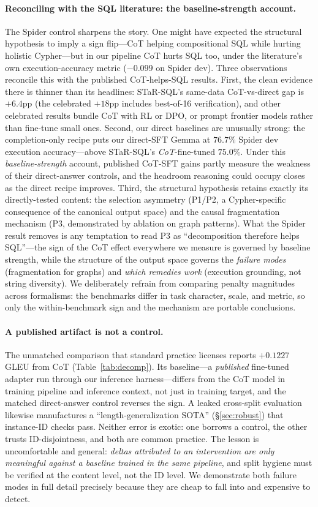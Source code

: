 \documentclass[11pt]{article}
\begin{document}
\paragraph{Reconciling with the SQL literature: the baseline-strength account.} The Spider control
sharpens the story. One might have expected the structural hypothesis to imply a sign flip---CoT
helping compositional SQL while hurting holistic Cypher---but in our pipeline CoT hurts SQL too,
under the literature's own execution-accuracy metric ($-0.099$ on Spider dev). Three observations
reconcile this with the published CoT-helps-SQL results. First, the clean evidence there is thinner
than its headlines: STaR-SQL's same-data CoT-vs-direct gap is $+6.4$pp (the celebrated $+18$pp
includes best-of-16 verification), and other celebrated results bundle CoT with RL or DPO, or prompt
frontier models rather than fine-tune small ones. Second, our direct baselines are unusually strong:
the completion-only recipe puts our direct-SFT Gemma at $76.7\%$ Spider dev execution
accuracy---above STaR-SQL's \emph{CoT}-fine-tuned $75.0\%$. Under this \emph{baseline-strength}
account, published CoT-SFT gains partly measure the weakness of their direct-answer controls, and
the headroom reasoning could occupy closes as the direct recipe improves. Third, the structural
hypothesis retains exactly its directly-tested content: the selection asymmetry (P1/P2, a
Cypher-specific consequence of the canonical output space) and the causal fragmentation mechanism
(P3, demonstrated by ablation on graph patterns). What the Spider result removes is any temptation
to read P3 as ``decomposition therefore helps SQL''---the sign of the CoT effect everywhere we
measure is governed by baseline strength, while the structure of the output space governs the
\emph{failure modes} (fragmentation for graphs) and \emph{which remedies work} (execution grounding,
not string diversity). We deliberately refrain from comparing penalty magnitudes across formalisms:
the benchmarks differ in task character, scale, and metric, so only the within-benchmark sign and
the mechanism are portable conclusions.

\paragraph{A published artifact is not a control.} The unmatched comparison that standard practice
licenses reports $+0.1227$ GLEU from CoT (Table~\ref{tab:decomp}). Its baseline---a \emph{published}
fine-tuned adapter run through our inference harness---differs from the CoT model in training
pipeline and inference context, not just in training target, and the matched direct-answer control
reverses the sign. A leaked cross-split evaluation likewise manufactures a ``length-generalization
SOTA'' (\S\ref{sec:robust}) that instance-ID checks pass. Neither error is exotic: one borrows a
control, the other trusts ID-disjointness, and both are common practice. The lesson is uncomfortable
and general: \emph{deltas attributed to an intervention are only meaningful against a baseline
trained in the same pipeline}, and split hygiene must be verified at the content level, not the ID
level. We demonstrate both failure modes in full detail precisely because they are cheap to fall
into and expensive to detect.
\end{document}

